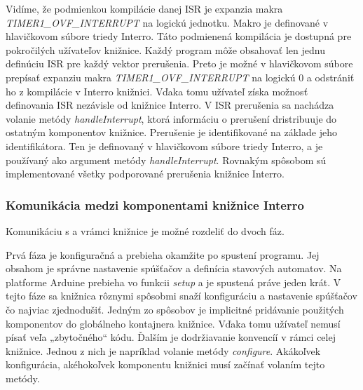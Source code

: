 Vidíme, že podmienkou kompilácie danej ISR je expanzia makra \\ \textit{TIMER1\_OVF\_INTERRUPT} na logickú jednotku. Makro je definované v hlavičkovom súbore triedy Interro.
Táto podmienená kompilácia je dostupná pre pokročilých užívateľov knižnice. Každý program môže obsahovať len jednu definúciu ISR pre každý vektor prerušenia. Preto je
možné v hlavičkovom súbore prepísať expanziu makra \textit{TIMER1\_OVF\_INTERRUPT} na logickú 0 a odstrániť ho z kompilácie v Interro knižnici. Vďaka tomu užívateľ získa
možnosť definovania ISR nezávisle od knižnice Interro. V ISR prerušenia sa nachádza volanie metódy \textit{handleInterrupt}, ktorá informáciu o prerušení dristribuuje
do ostatným komponentov knižnice. Prerušenie je identifikované na základe jeho identifikátora. Ten je definovaný v hlavičkovom súbore triedy Interro, a je používaný
ako argument metódy \textit{handleInterrupt}.
Rovnakým spôsobom sú implementované všetky podporované prerušenia knižnice Interro.

\subsubsection{Komunikácia medzi komponentami knižnice Interro}
Komunikáciu s a vrámci knižnice je možné rozdeliť do dvoch fáz. \par
Prvá fáza je konfiguračná a prebieha okamžite po spustení programu. Jej obsahom je správne
nastavenie spúšťačov a definícia stavových automatov. Na platforme Arduine prebieha vo funkcii \textit{setup} a je spustená práve jeden krát. V tejto fáze sa knižnica
rôznymi spôsobmi snaží konfiguráciu a nastavenie spúšťačov čo najviac zjednodušiť. Jedným zo spôsobov je implicitné pridávanie použitých komponentov do globálneho
kontajnera knižnice. Vďaka tomu užívateľ nemusí písať veľa „zbytočného“ kódu. Ďalším je dodržiavanie konvencíí v rámci celej knižnice. Jednou z nich je napríklad
volanie metódy \textit{configure}. Akákoľvek konfigurácia, akéhokoľvek komponentu knižnici musí začínať volaním tejto metódy.  \par

